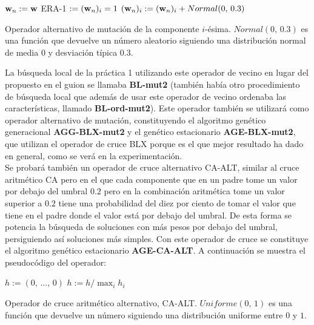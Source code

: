 \documentclass{article}
\newenvironment{algo}{
	\vspace*{0.5cm}
	\begin{algorithm}[H]}{
	\end{algorithm}
	\vspace*{0.5cm}
}
\begin{document}
\begin{algo}
	$\normalfont \textbf w_n := \normalfont \textbf w$\;
	ERA-1 $:= (\normalfont \textbf w_n)_i = 1$\;
	$(\normalfont \textbf w_n)_i := (\normalfont \textbf w_n)_i + Normal(0,\, 0.3)$\;
	\vspace{0.2cm}
	\caption{Operador alternativo de mutación de la componente $i$-ésima. $Normal(0,\, 0.3)$ es una función que devuelve un número aleatorio siguiendo una distribución normal de media $0$ y desviación típica $0.3$.}
\end{algo}

La búsqueda local de la práctica 1 utilizando este operador de vecino en lugar del propuesto en el guion se llamaba \textbf{BL-mut2} (también había otro procedimiento de búsqueda local que además de usar este operador de vecino ordenaba las características, llamado \textbf{BL-ord-mut2}). Este operador también se utilizará como operador alternativo de mutación, constituyendo el algoritmo genético generacional \textbf{AGG-BLX-mut2} y el genético estacionario \textbf{AGE-BLX-mut2}, que utilizan el operador de cruce BLX porque es el que mejor resultado ha dado en general, como se verá en la experimentación. \\

Se probará también un operador de cruce alternativo CA-ALT, similar al cruce aritmético CA pero en el que cada componente que en un padre tome un valor por debajo del umbral $0.2$ pero en la combinación aritmética tome un valor superior a $0.2$ tiene una probabilidad del diez por ciento de tomar el valor que tiene en el padre donde el valor está por debajo del umbral. De esta forma se potencia la búsqueda de soluciones con más pesos por debajo del umbral, persiguiendo así soluciones más simples. Con este operador de cruce se constituye el algoritmo genético estacionario \textbf{AGE-CA-ALT}. A continuación se muestra el pseudocódigo del operador:

\begin{algo}
	
	$h := (0,\,...,\,0)$\;
	$h := h / \max_i h_i$
	
	\vspace{0.2cm}
	\caption{Operador de cruce aritmético alternativo, CA-ALT. $Uniforme(0,\, 1)$ es una función que devuelve un número siguiendo una distribución uniforme entre $0$ y $1$.}
\end{algo}
\end{document}
